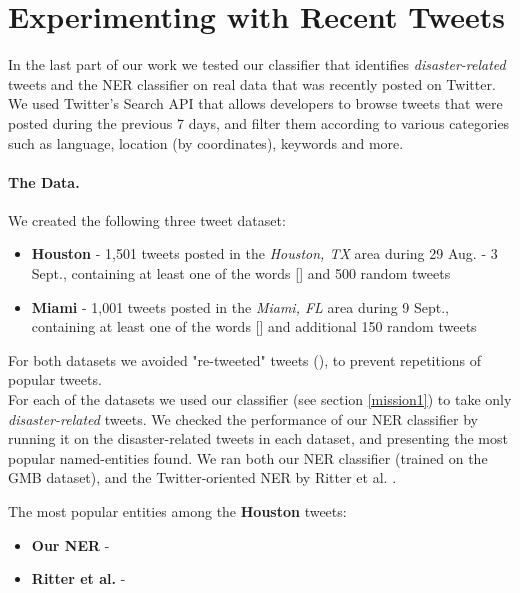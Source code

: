 \documentclass[letterpaper,twocolumn,10pt]{article}
\begin{document}
\section{Experimenting with Recent Tweets} \label{recent-tweets-results}

In the last part of our work we tested our classifier that identifies \textit{disaster-related} tweets and the NER classifier on real data that was recently posted on Twitter. We used Twitter's Search API that allows developers to browse tweets that were posted during the previous 7 days, and filter them according to various categories such as language, location (by coordinates), keywords and more.

\paragraph{The Data.} We created the following three tweet dataset:

\begin{itemize}[noitemsep, nolistsep]
	\item\textbf{Houston} - 1,501 tweets posted in the \textit{Houston, TX} area during 29 Aug. - 3 Sept., containing at least one of the words [] and 500 random tweets
	\item\textbf{Miami} - 1,001 tweets posted in the \textit{Miami, FL} area during 9 Sept., containing at least one of the words [] and additional 150 random tweets
\end{itemize}

For both datasets we avoided "re-tweeted" tweets (), to prevent repetitions of popular tweets.\\

For each of the datasets we used our classifier (see section \ref{mission1}) to take only \textit{disaster-related} tweets. We checked the performance of our NER classifier by running it on the disaster-related tweets in each dataset, and presenting the most popular named-entities found. We ran both our NER classifier (trained on the GMB dataset), and the Twitter-oriented NER by Ritter et al. \cite{Ritter11}.

The most popular entities among the \textbf{Houston} tweets:

\begin{itemize}[noitemsep]
	\item\textbf{Our NER} - 
	\item\textbf{Ritter et al.} - 
\end{itemize}
\end{document}
